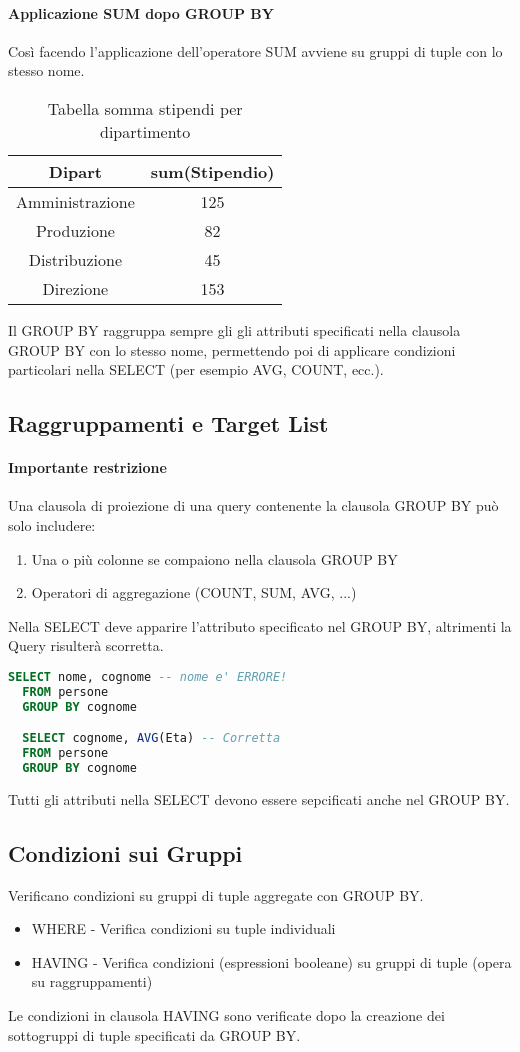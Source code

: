 \paragraph*{Applicazione SUM dopo GROUP BY} 
Così facendo l'applicazione dell'operatore SUM avviene su gruppi di tuple con lo stesso nome.
\begin{table}[h]
  \centering
  \begin{tabular}{|c|c|}
    \hline
    Dipart & sum(Stipendio) \\
    \hline
    Amministrazione & 125 \\
    \hline
    Produzione & 82 \\
    \hline
    Distribuzione & 45\\
    \hline
    Direzione & 153 \\
    \hline
  \end{tabular}
  \caption{Tabella somma stipendi per dipartimento}
  \label{tabella_stipendi}
\end{table}
\newpage
Il GROUP BY raggruppa sempre gli gli attributi specificati nella clausola GROUP BY con lo stesso
nome, permettendo poi di applicare condizioni particolari nella SELECT (per esempio AVG, COUNT, ecc.).
\subsection{Raggruppamenti e Target List}
\paragraph*{Importante restrizione} Una clausola di proiezione di una query contenente la clausola
GROUP BY può solo includere:
\begin{enumerate}
  \item Una o più colonne se compaiono nella clausola GROUP BY
  \item Operatori di aggregazione (COUNT, SUM, AVG, ...)
\end{enumerate}
Nella SELECT deve apparire l'attributo specificato nel GROUP BY, altrimenti la Query risulterà
scorretta.
\begin{lstlisting}[language=SQL]
  SELECT nome, cognome -- nome e' ERRORE!
  FROM persone
  GROUP BY cognome

  SELECT cognome, AVG(Eta) -- Corretta
  FROM persone
  GROUP BY cognome
\end{lstlisting}
Tutti gli attributi nella SELECT devono essere sepcificati anche nel GROUP BY.
\subsection{Condizioni sui Gruppi}
Verificano condizioni su gruppi di tuple aggregate con GROUP BY.
\begin{itemize}
  \item WHERE - Verifica condizioni su tuple individuali
  \item HAVING - Verifica condizioni (espressioni booleane) su gruppi di tuple
  (opera su raggruppamenti)
\end{itemize}
Le condizioni in clausola HAVING sono verificate dopo la creazione dei sottogruppi
di tuple specificati da GROUP BY.\\
